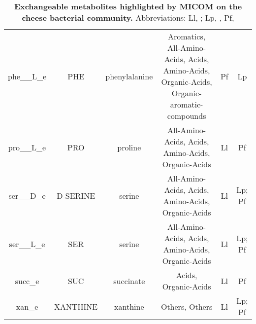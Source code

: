 \documentclass[../main.tex]{subfiles}
\begin{document}
\begin{table}[H]
\begin{adjustbox}{width=1.2\textwidth}
\begin{tabular}{|c|c|c|c|c|c|}
phe\_\_L\_e &	PHE &	phenylalanine &	Aromatics, All-Amino-Acids, Acids, Amino-Acids, Organic-Acids, Organic-aromatic-compounds &	Pf	& Lp \\
pro\_\_L\_e &	PRO &	proline &	All-Amino-Acids, Acids, Amino-Acids, Organic-Acids &	Ll	& Pf \\
ser\_\_D\_e &	D-SERINE &	serine	& All-Amino-Acids, Acids, Amino-Acids, Organic-Acids &	Ll	& Lp; Pf \\
ser\_\_L\_e &	SER	& serine &	All-Amino-Acids, Acids, Amino-Acids, Organic-Acids &	Ll &	Lp; Pf \\
succ\_e &	SUC	& succinate	& Acids, Organic-Acids &	Ll &	Pf \\
xan\_e &	XANTHINE &	xanthine &	Others, Others &	Ll	& Lp; Pf \\
 \hline
\end{tabular}
\end{adjustbox}
\caption{\textbf{Exchangeable metabolites highlighted by MICOM on the cheese bacterial community.} Abbreviations: Ll, \lactis; Lp, \plantarum, Pf, \freud}
\label{table:exchangeable-metabolites-MICOM}
\end{table}
\end{document}
